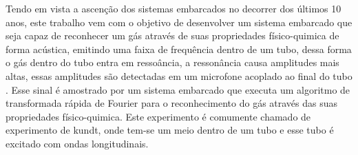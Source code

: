 
\begin{resumoutfpr}%
    Tendo em vista a ascenção dos sistemas embarcados no decorrer dos últimos 10 anos, este trabalho vem com o objetivo de desenvolver um sistema embarcado que seja capaz de reconhecer um gás através de suas propriedades físico-quimica de forma acústica, emitindo uma faixa de frequência dentro de um tubo, dessa forma o gás dentro do tubo entra em ressoância, a ressonância causa amplitudes mais altas, essas amplitudes são detectadas em um microfone acoplado ao final do tubo . Esse sinal é amostrado por um sistema embarcado que executa um algoritmo de transformada rápida de Fourier para o reconhecimento do gás através das suas propriedades físico-quimica. Este experimento é comumente chamado de experimento de kundt, onde tem-se um meio dentro de um tubo e esse tubo é excitado com ondas longitudinais.
\end{resumoutfpr}